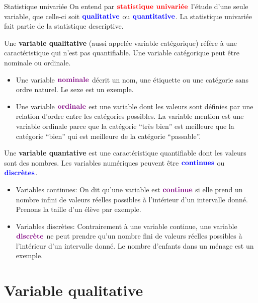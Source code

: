 \documentclass[
  8pt,
  ignorenonframetext,
]{beamer}
\begin{document}
\begin{frame}{Statistique univariée}
On entend par \(\color{red}{\textbf{statistique univariée}}\) l'étude
d'une seule variable, que celle-ci soit
\(\color{blue}{\textbf{qualitative}}\) ou
\(\color{blue}{\textbf{quantitative}}\). La statistique univariée fait
partie de la statistique descriptive.

\pause

Une \textbf{variable qualitative} (aussi appelée variable catégorique)
réfère à une caractéristique qui n'est pas quantifiable. Une variable
catégorique peut être nominale ou ordinale. \pause

\begin{itemize}
\item
  Une variable \(\color{violet}{\textbf{nominale}}\) décrit un nom, une
  étiquette ou une catégorie sans ordre naturel. Le sexe est un exemple.
\item
  Une variable \(\color{violet}{\textbf{ordinale}}\) est une variable
  dont les valeurs sont définies par une relation d'ordre entre les
  catégories possibles. La variable mention est une variable ordinale
  parce que la catégorie ``très bien'' est meilleure que la catégorie
  ``bien'' qui est meilleure de la catégorie ``passable''.\pause
\end{itemize}

Une \textbf{variable quantative} est une caractéristique quantifiable
dont les valeurs sont des nombres. Les variables numériques peuvent être
\(\color{blue}{\textbf{continues}}\) ou
\(\color{blue}{\textbf{discrètes}}\).\pause

\begin{itemize}
\item
  Variables continues: On dit qu'une variable est
  \(\color{violet}{\textbf{continue}}\) si elle prend un nombre infini
  de valeurs réelles possibles à l'intérieur d'un intervalle donné.
  Prenons la taille d'un élève par exemple.\pause
\item
  Variables discrètes: Contrairement à une variable continue, une
  variable \(\color{violet}{\textbf{discrète}}\) ne peut prendre qu'un
  nombre fini de valeurs réelles possibles à l'intérieur d'un intervalle
  donné. Le nombre d'enfants dans un ménage est un exemple.
\end{itemize}
\end{frame}

\hypertarget{variable-qualitative}{%
\section{Variable qualitative}\label{variable-qualitative}}
\end{document}
